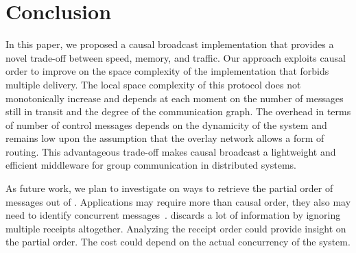 
\section{Conclusion}
\label{sec:conclusion}

In this paper, we proposed a causal broadcast implementation that provides a
novel trade-off between speed, memory, and traffic.  Our approach exploits
causal order to improve on the space complexity of the implementation that
forbids multiple delivery.  The local space complexity of this protocol does not
monotonically increase and depends at each moment on the number of messages
still in transit and the degree of the communication graph.
The overhead in terms of number of control messages depends on the dynamicity of
the system and remains low upon the assumption that the overlay network allows a
form of routing.
This advantageous trade-off makes causal broadcast a lightweight and efficient
middleware for group communication in distributed systems. 

As future work, we plan to investigate on ways to retrieve the partial order of
messages out of \RPCBROADCAST.
Applications may require more than causal order, they also may need to identify
concurrent messages~\cite{sun2009contextbased}. \RPCBROADCAST discards a lot of
information by ignoring multiple receipts altogether. Analyzing the receipt
order could provide insight on the partial order. The cost could depend on the
actual concurrency of the system.

